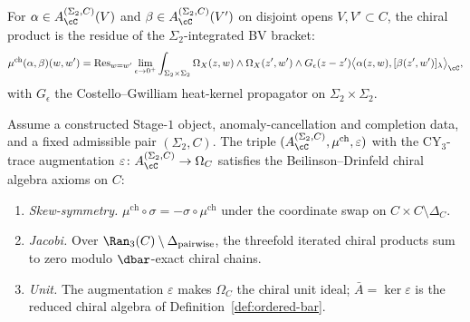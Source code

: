 \begin{definition}
\label{def:stage2-chiral-product}
For $\alpha\in A_\cC^{(\Sigma_2,C)}(V)$ and $\beta\in A_\cC^{(\Sigma_2,C)}(V')$ on disjoint opens $V,V'\subset C$, the chiral product is the residue of the $\Sigma_2$-integrated BV bracket:
\[
 \mu^{\mathrm{ch}}(\alpha,\beta)(w,w')
 =\mathrm{Res}_{w=w'}\lim_{\epsilon\to 0^+}
 \int_{\Sigma_2\times\Sigma_2}
 \Omega_X(z,w)\wedge\Omega_X(z',w')\wedge G_\epsilon(z-z')
 \bigl\langle\alpha(z,w),[\beta(z',w')]_\lambda\bigr\rangle_\cC,
\]
with $G_\epsilon$ the Costello--Gwilliam heat-kernel propagator on $\Sigma_2\times\Sigma_2$.
\end{definition}

\begin{theorem}
\label{thm:stage2-bd-axioms}
Assume a constructed Stage-$1$ object, anomaly-cancellation and completion data, and a fixed admissible pair $(\Sigma_2,C)$. The triple $(A_\cC^{(\Sigma_2,C)},\mu^{\mathrm{ch}},\varepsilon)$ with the CY$_3$-trace augmentation $\varepsilon\colon A_\cC^{(\Sigma_2,C)}\to\Omega_C$ satisfies the Beilinson--Drinfeld chiral algebra axioms on $C$:
\begin{enumerate}[label=\textup{(\arabic*)}]
 \item \emph{Skew-symmetry.} $\mu^{\mathrm{ch}}\circ\sigma=-\sigma\circ\mu^{\mathrm{ch}}$ under the coordinate swap on $C\times C\setminus\Delta_C$.
 \item \emph{Jacobi.} Over $\Ran_3(C)\setminus\Delta_{\mathrm{pairwise}}$, the threefold iterated chiral products sum to zero modulo $\dbar$-exact chiral chains.
 \item \emph{Unit.} The augmentation $\varepsilon$ makes $\Omega_C$ the chiral unit ideal; $\bar A=\ker\varepsilon$ is the reduced chiral algebra of Definition~\ref{def:ordered-bar}.
\end{enumerate}
\end{theorem}

